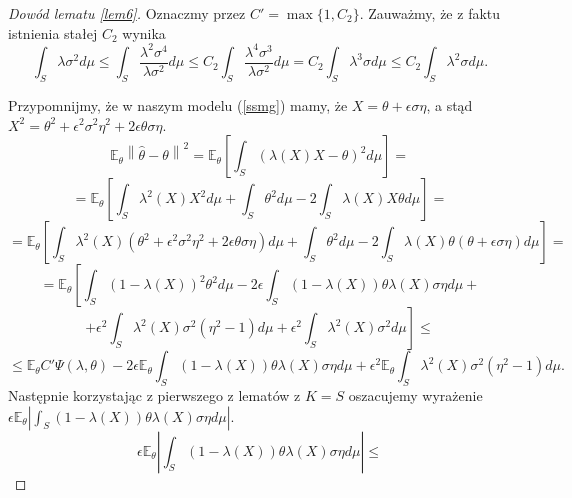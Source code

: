 \documentclass{mwart}
\newcommand{\norm}[1]{\left\lVert#1\right\rVert}
\begin{document}
\begin{proof}[Dowód lematu \ref{lem6}]
Oznaczmy przez $C'=\max\{1,C_2\}$. Zauważmy, że z faktu istnienia stałej $C_2$ wynika
\begin{displaymath}
\int_S\lambda\sigma^2d\mu\leq \int_S\frac{\lambda^2\sigma^4}{\lambda\sigma^2}d\mu\leq C_2 \int_S\frac{\lambda^4\sigma^3}{\lambda\sigma^2}d\mu=C_2\int_S\lambda^3\sigma d\mu\leq C_2\int_S\lambda^2\sigma d\mu.
\end{displaymath}


Przypomnijmy, że w naszym modelu (\ref{ssmg}) mamy, że $X=\theta+\epsilon\sigma\eta$, a stąd $X^2=\theta^2+\epsilon^2\sigma^2\eta^2+2\epsilon\theta\sigma\eta$.
\begin{displaymath}
\mathbb{E}_{\theta}\norm{\hat{\theta}-\theta}^2=\mathbb{E}_{\theta}\left[\int_S\left(\lambda(X)X-\theta\right)^2d\mu\right]=
\end{displaymath}
\begin{displaymath}
=\mathbb{E}_{\theta}\left[\int_S\lambda^2(X)X^2d\mu+\int_S\theta^2d\mu-2\int_S\lambda(X)X\theta d\mu\right]=
\end{displaymath}
\begin{displaymath}
=\mathbb{E}_{\theta}\left[\int_S\lambda^2(X)\left(\theta^2+\epsilon^2\sigma^2\eta^2+2\epsilon\theta\sigma\eta\right)d\mu+\int_S\theta^2d\mu-2\int_S\lambda(X)\theta\left(\theta+\epsilon\sigma\eta\right)d\mu\right]=
\end{displaymath}
\begin{displaymath}
=\mathbb{E}_{\theta}\left[\int_S(1-\lambda(X))^2\theta^2d\mu-2\epsilon\int_S(1-\lambda(X))\theta\lambda(X)\sigma\eta d\mu+\right.
\end{displaymath}
\begin{displaymath}
+\left.\epsilon^2\int_S\lambda^2(X)\sigma^2(\eta^2-1)d\mu+\epsilon^2\int_S\lambda^2(X)\sigma^2d\mu\right]\leq 
\end{displaymath}
\begin{displaymath}
\leq \mathbb{E}_{\theta}C'\Psi(\lambda,\theta)-2\epsilon\mathbb{E}_{\theta}\int_S(1-\lambda(X))\theta\lambda(X)\sigma\eta d\mu+\epsilon^2\mathbb{E}_{\theta}\int_S\lambda^2(X)\sigma^2(\eta^2-1)d\mu.
\end{displaymath}
Następnie korzystając z pierwszego z lematów z $K=S$ oszacujemy wyrażenie $\epsilon\mathbb{E}_{\theta}\left|\int_S(1-\lambda (X))\theta \lambda (X)\sigma\eta d\mu\right|$. 
\begin{displaymath}
\epsilon\mathbb{E}_{\theta}\left|\int_S(1-\lambda (X))\theta \lambda (X)\sigma\eta d\mu\right|\leq

\end{displaymath}
\end{proof}
\end{document}
